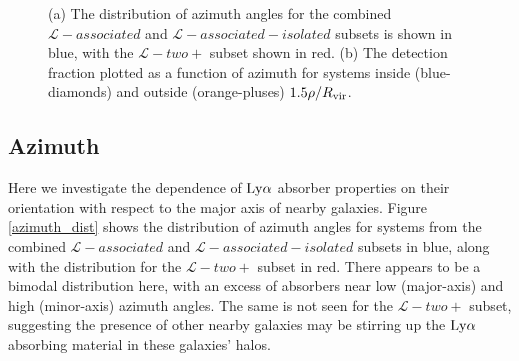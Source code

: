 
\begin{figure}[ht!]
        \centering
        \vspace{0pt}
        \caption{\small{(a) The distribution of azimuth angles for the combined $\mathcal{L}-associated$ and $\mathcal{L}-associated-isolated$ subsets is shown in blue, with the $\mathcal{L}-two+$ subset shown in red. (b) The detection fraction plotted as a function of azimuth for systems inside (blue-diamonds) and outside (orange-pluses) $1.5 \rho / R_{\rm vir}$.}}
        \vspace{5pt}
        \label{detection_fraction_inc_both}
\end{figure}


\subsection{Azimuth}
Here we investigate the dependence of $\rm Ly\alpha$ absorber properties on their orientation with respect to the major axis of nearby galaxies. Figure \ref{azimuth_dist} shows the distribution of azimuth angles for systems from the combined $\mathcal{L}-associated$ and $\mathcal{L}-associated-isolated$ subsets in blue, along with the distribution for the $\mathcal{L}-two+$ subset in red. There appears to be a bimodal distribution here, with an excess of absorbers near low (major-axis) and high (minor-axis) azimuth angles. The same is not seen for the 
$\mathcal{L}-two+$ subset, suggesting the presence of other nearby galaxies may be stirring up the $\rm Ly\alpha$ absorbing material in these galaxies' halos. 

